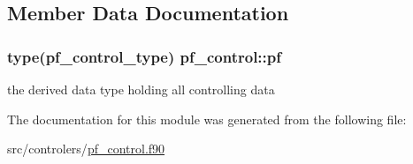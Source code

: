 \subsection{Member Data Documentation}
\hypertarget{classpf__control_aa7bb53e2dfc844fb482e69ac9b483415}{
\subsubsection[{pf}]{\setlength{\rightskip}{0pt plus 5cm}type({\bf pf\-\_\-control\-\_\-type}) pf\-\_\-control\-::pf}}\label{classpf__control_aa7bb53e2dfc844fb482e69ac9b483415}


the derived data type holding all controlling data 



The documentation for this module was generated from the following file\-:\begin{DoxyCompactItemize}
\item 
src/controlers/\hyperlink{pf__control_8f90}{pf\-\_\-control.\-f90}\end{DoxyCompactItemize}
